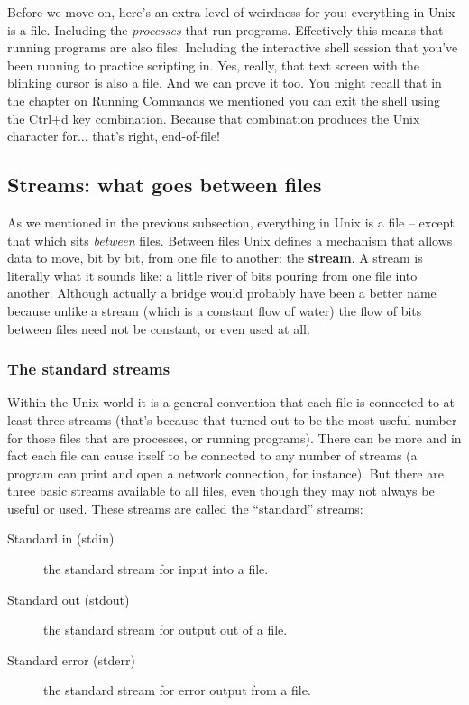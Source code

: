 Before we move on, here's an extra level of weirdness for you: everything in
Unix is a file. Including the \emph{processes} that run programs. Effectively
this means that running programs are also files. Including the interactive
shell session that you've been running to practice scripting in. Yes, really,
that text screen with the blinking cursor is also a file. And we can prove it
too. You might recall that in the chapter on Running Commands we mentioned you
can exit the shell using the Ctrl+d key combination.  Because that combination
produces the Unix character for... that's right, end-of-file!

\subsection{Streams: what goes between files}
As we mentioned in the previous subsection, everything in Unix is a file --
except that which sits \emph{between} files. Between files Unix defines a
mechanism that allows data to move, bit by bit, from one file to another: the
\textbf{stream}. A stream is literally what it sounds like: a little river of
bits pouring from one file into another. Although actually a bridge would
probably have been a better name because unlike a stream (which is a constant
flow of water) the flow of bits between files need not be constant, or even
used at all.

\subsubsection{The standard streams}
Within the Unix world it is a general convention that each file is connected to
at least three streams (that's because that turned out to be the most useful
number for those files that are processes, or running programs). There can be
more and in fact each file can cause itself to be connected to any number of
streams (a program can print and open a network connection, for instance). But
there are three basic streams available to all files, even though they may not
always be useful or used. These streams are called the ``standard'' streams:
\begin{description}
	\item[Standard in (stdin)] the standard stream for input into a file.
	\item[Standard out (stdout)] the standard stream for output out of a file.
	\item[Standard error (stderr)] the standard stream for error output from a file.
\end{description}

